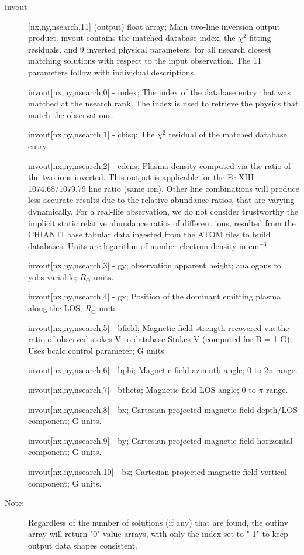 \documentclass{article}
\begin{document}
\begin{description}
\newpage           
    \item[invout]
    		[nx,ny,nsearch,11] (output) float array; Main two-line inversion output product. invout contains the matched database index, the $\chi^2$ fitting residuals, and 9 inverted physical parameters, for all nsearch closest matching solutions with respect to the input observation. The 11 parameters follow with individual descriptions.
    	\item[]  
    		invout[nx,ny,nsearch,0] - index; The index of the database entry that was matched at the nsearch rank. The index is used to retrieve the physics that match the observations. 
    	\item[]  
    		invout[nx,ny,nsearch,1] - chisq; The $\chi^2$ residual of the matched database entry.
    	\item[]  
    	    invout[nx,ny,nsearch,2] - edens; Plasma density computed via the ratio of the two ions inverted. This output is applicable for the Fe XIII 1074.68/1079.79 line ratio (same ion). Other line combinations will produce less accurate results due to the relative abundance ratios, that are varying dynamically. For a real-life observation, we do not consider trustworthy the implicit static relative abundance ratios of different ions, resulted from the CHIANTI base tabular data ingested from the ATOM files to build databases. Units are logarithm of number electron density in cm$^{-3}$.
    	\item[]   
    		invout[nx,ny,nsearch,3] - gy; observation apparent height; analogous to yobs variable; $R_\odot$ units.
    	\item[]
    		invout[nx,ny,nsearch,4] - gx; Position of the dominant emitting plasma along the LOS; $R_\odot$ units. 
    	\item[]
    		invout[nx,ny,nsearch,5] - bfield; Magnetic field strength recovered via the ratio of observed stokes V to database Stokes V (computed for B = 1 G); Uses bcalc control parameter; G units.       	
    	\item[]  
    		invout[nx,ny,nsearch,6] - bphi; Magnetic field azimuth angle; 0 to $2\pi$ range.
    	\item[]
    		invout[nx,ny,nsearch,7] - btheta; Magnetic field LOS angle; 0 to $\pi$ range.      	
    	\item[]
    		invout[nx,ny,nsearch,8] - bx; Cartesian projected magnetic field depth/LOS component; G units.
    	\item[]
    		invout[nx,ny,nsearch,9] - by; Cartesian projected magnetic field horizontal component; G units.  	
    	\item[]
    		invout[nx,ny,nsearch,10] - bz; Cartesian projected magnetic field vertical component; G units.
    	\item[Note:]
    	   Regardless of the number of solutions (if any) that are found, the outinv array will return  "0" value arrays, with only the index set to "-1" to keep output data shapes consistent. 	                       
\end{description}
\end{document}
